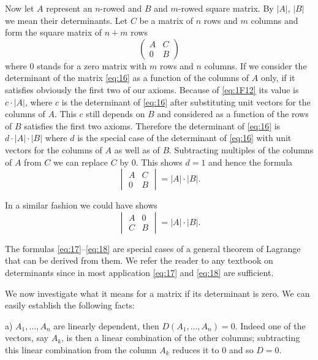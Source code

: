 \documentclass[10pt,leqno,a5paper]{book}
\theoremstyle{definition}
\begin{document}
Now let $A$ represent an $n$-rowed and $B$ and $m$-rowed square matrix.
By $|A|$, $|B|$ we mean their determinants.
Let $C$ be a matrix of $n$ rows and $m$ columns and form the square matrix of $n+m$ rows
\begin{equation}
\label{eq:16}
\begin{pmatrix}
A & C
\\
0 & B
\end{pmatrix}
\end{equation}
where $0$ stands for a zero matrix with $m$ rows and $n$ columns.
If we consider the determinant of the matrix \eqref{eq:16} as a function of the columns of $A$ only, if it satisfies obviously the first two of our axioms.
Because of \eqref{eq:1F12} its value is $c \cdot |A|$, where $c$ is the determinant of \eqref{eq:16} after substituting unit vectors for the columns of $A$.
This $c$ still depends on $B$ and considered as a function of the rows of $B$ satisfies the first two axioms.
Therefore the determinant of \eqref{eq:16} is $d \cdot |A| \cdot |B|$ where $d$ is the special case of the determinant of \eqref{eq:16} with unit vectors for the columns of $A$ as well as of $B$.
Subtracting multiples of the columns of $A$ from $C$ we can replace $C$ by $0$.
This shows $d = 1$ and hence the formula
\begin{equation}
\label{eq:17}
\begin{vmatrix}
A & C
\\
0 & B
\end{vmatrix}
= |A| \cdot |B|.
\end{equation}

In a similar fashion we could have shows
\begin{equation}
\label{eq:18}
\begin{vmatrix}
A & 0
\\
C & B
\end{vmatrix}
= |A| \cdot |B|.
\end{equation}

The formulas \eqref{eq:17}--\eqref{eq:18} are special cases of a general theorem of Lagrange that can be derived from them.
We refer the reader to any textbook on determinants since in most application \eqref{eq:17} and \eqref{eq:18} are sufficient.

We now investigate what it means for a matrix if its determinant is zero.
We can easily establish the following facts:

a) $A_1, \ldots, A_n$ are linearly dependent, then $D(A_1, \ldots, A_n) = 0$.
Indeed one of the vectors, say $A_k$, is then a linear combination of the other columns; subtracting this linear combination from the column $A_k$ reduces it to $0$ and so $D = 0$.
\end{document}
